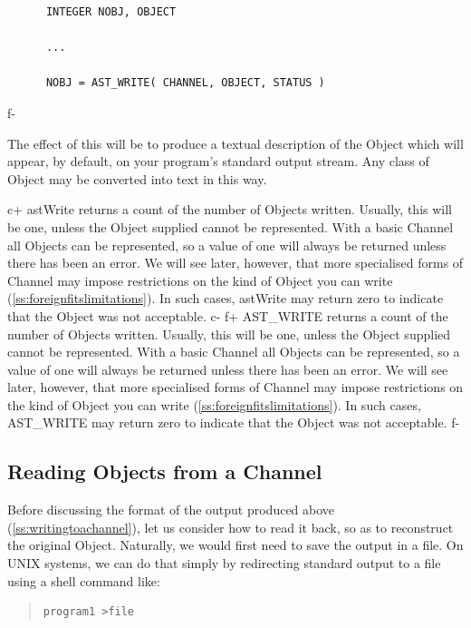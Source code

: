 \documentclass[twoside,11pt]{article}
\newcommand{\secref}[1]{\S\ref{#1}}
\renewcommand{\secref}[1]{\ref{#1}}
\begin{document}
\small
\begin{verbatim}
      INTEGER NOBJ, OBJECT

      ...

      NOBJ = AST_WRITE( CHANNEL, OBJECT, STATUS )
\end{verbatim}
\normalsize
f-

The effect of this will be to produce a textual description of the
Object which will appear, by default, on your program's standard
output stream. Any class of Object may be converted into text in this
way.

c+
astWrite returns a count of the number of Objects written. Usually,
this will be one, unless the Object supplied cannot be
represented. With a basic Channel all Objects can be represented, so a
value of one will always be returned unless there has been an
error. We will see later, however, that more specialised forms of
Channel may impose restrictions on the kind of Object you can write
(\secref{ss:foreignfitslimitations}). In such cases, astWrite may
return zero to indicate that the Object was not acceptable.
c-
f+
AST\_WRITE returns a count of the number of Objects written. Usually,
this will be one, unless the Object supplied cannot be
represented. With a basic Channel all Objects can be represented, so a
value of one will always be returned unless there has been an
error. We will see later, however, that more specialised forms of
Channel may impose restrictions on the kind of Object you can write
(\secref{ss:foreignfitslimitations}). In such cases, AST\_WRITE may
return zero to indicate that the Object was not acceptable.
f-

\subsection{\label{ss:readingfromachannel}Reading Objects from a Channel}

Before discussing the format of the output produced above
(\secref{ss:writingtoachannel}), let us consider how to read it back,
so as to reconstruct the original Object. Naturally, we would first
need to save the output in a file. On UNIX systems, we can do that
simply by redirecting standard output to a file using a shell command
like:

\begin{quote}
\small
\begin{verbatim}
program1 >file
\end{verbatim}
\normalsize
\end{quote}
\end{document}
